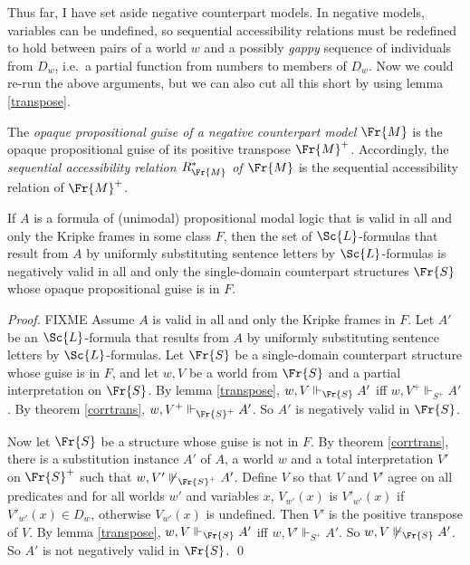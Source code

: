\documentclass[11pt]{woarticle}
\theoremstyle{break}
\theoremstyle{nonumberplain}
\newcommand{\SAT}{\Vdash}
\newcommand{\1}{\;\,|\;\,}
\begin{document}
Thus far, I have set aside negative counterpart models. In negative
models, variables can be undefined, so sequential accessibility
relations must be redefined to hold between pairs of a world $w$ and a
possibly \emph{gappy} sequence of individuals from $D_w$, i.e.\ a
partial function from numbers to members of $D_w$. Now we could re-run
the above arguments, but we can also cut all this short by using lemma
\ref{transpose}.

\begin{definition}{\label{!OPAQUE}}
  The \emph{opaque propositional guise of a negative counterpart
    model} $\Fr{M}$ is the opaque propositional guise of its
  positive transpose $\Fr{M}^+$. Accordingly, the \emph{sequential
    accessibility relation $R^*_{\Fr{M}}$ of $\Fr{M}$} is the
  sequential accessibility relation of $\Fr{M}^+$.
\end{definition}

\begin{corollary}{\label{corrtransn}}
  If $A$ is a formula of (unimodal) propositional modal logic that is
  valid in all and only the Kripke frames in some class $F$, then the
  set of $\Sc{L}$-formulas that result from $A$ by uniformly
  substituting sentence letters by $\Sc{L}$-formulas is negatively
  valid in all and only the single-domain counterpart structures
  $\Fr{S}$ whose opaque propositional guise is in $F$.
\end{corollary}

\begin{proof}
  FIXME
  Assume $A$ is valid in all and only the Kripke frames in $F$. Let
  $A'$ be an $\Sc{L}$-formula that results from $A$ by uniformly
  substituting sentence letters by $\Sc{L}$-formulas. Let $\Fr{S}$ be
  a single-domain counterpart structure whose guise is in $F$, and let
  $w,V$ be a world from $\Fr{S}$ and a partial interpretation on
  $\Fr{S}$. By lemma \ref{transpose}, $w,V \SAT_{\Fr{S}} A'$ iff
  $w,V^+ \SAT_{S^+} A'$. By theorem \ref{corrtrans}, $w,V^+
  \SAT_{\Fr{S}^+} A'$. So $A'$ is negatively valid in $\Fr{S}$.

  Now let $\Fr{S}$ be a structure whose guise is not in $F$. By
  theorem \ref{corrtrans}, there is a substitution instance $A'$ of
  $A$, a world $w$ and a total interpretation $V'$ on $\Fr{S}^+$ such
  that $w,V' \not\SAT_{\Fr{S}^+} A'$. Define $V$ so that $V$ and $V'$
  agree on all predicates and for all worlds $w'$ and variables $x$,
  $V_{w'}(x)$ is $V'_{w'}(x)$ if $V'_{w'}(x) \in D_w$, otherwise
  $V_{w'}(x)$ is undefined. Then $V'$ is the positive transpose of
  $V$. By lemma \ref{transpose}, $w,V \SAT_{\Fr{S}} A'$ iff $w,V'
  \SAT_{S^+} A'$. So $w,V \not\SAT_{\Fr{S}} A'$. So $A'$ is not
  negatively valid in $\Fr{S}$. \qed
\end{proof}
\end{document}

